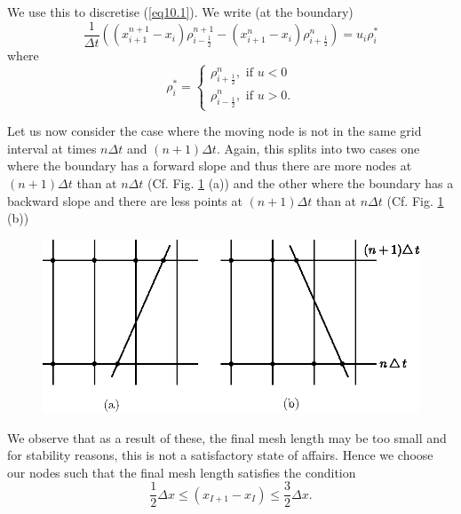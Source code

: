 We use this to discretise (\ref{eq10.1}). We write (at the boundary)
\begin{equation*}
\frac{1}{\Delta t} ((x^{n+1}_{i+1} - x_i) \rho^{n+1}_{i-\frac{1}{2}} - (x^n_{i+1} - x_i) \rho^n_{i+\frac{1}{2}}) = u_i \rho^*_i\tag{10.13}\label{eq10.13}
\end{equation*}
where\pageoriginale 
\begin{equation*}
\rho^*_i = 
\begin{cases}
\rho^n_{i+\frac{1}{2}}, \text{ if } u < 0\\
\rho^n_{i-\frac{1}{2}}, \text{ if } u > 0. 
\end{cases}
\tag{10.14}\label{eq10.14}
\end{equation*}

Let us now consider the case where the moving node is not in the same
grid interval at times $n\Delta t$ and $(n+1)\Delta t$. Again, this
splits into two cases one where the boundary has a forward slope and
thus there are more nodes at $(n+1)\Delta t$ than at $n\Delta t$
(Cf. Fig. \ref{c10:fig10.2} (a)) and the other where the boundary has a backward
slope and there are less points at $(n+1)\Delta t $ than at $n\Delta
t$ (Cf. Fig. \ref{c10:fig10.2} (b)) 

\begin{figure}[H]
\centering
\includegraphics{figures/fig52-10.2.eps}
\caption{}\label{c10:fig10.2}
\end{figure}

We observe that as a result of these, the final mesh length may be too
small and for stability  reasons, this is not a satisfactory state of
affairs. Hence we choose our nodes such that the final mesh length
satisfies the condition 
\begin{equation*}
\frac{1}{2} \Delta x \leq (x_{I+1} - x_I) \leq \frac{3}{2} \Delta x.
\tag{10.15}\label{eq10.15}
\end{equation*}

